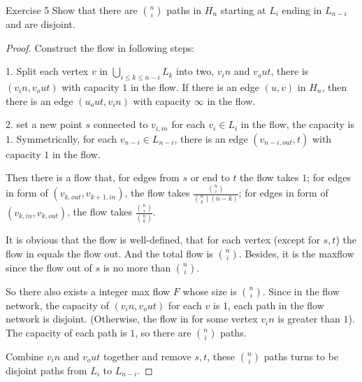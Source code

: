     \begin{thm}{Exercise 5}{}
        Show that there are $\binom{n}{i}$ paths in $H_n$ starting at $L_i$ ending in $L_{n-i}$ and are disjoint. 
    \end{thm}
    \begin{proof}
        Construct the flow in following steps: 

        1. Split each vertex $v$ in $\bigcup_{i\leq k\leq n-i}L_k$ into two, $v_in$ and $v_out$, there is $(v_in,v_out)$ with capacity $1$ in the flow. 
        If there is an edge $(u,v)$ in $H_n$, then there is an edge $(u_out, v_in)$ with capacity $\infty$ in the flow. 

        2. set a new point $s$ connected to $v_{i,in}$ for each $v_i\in L_i$ in the flow, the capacity is $1$. 
        Symmetrically, for each $v_{n-i}\in L_{n-i}$, there is an edge $(v_{n-i,out},t)$ with capacity $1$ in the flow. 

        Then there is a flow that, for edges from $s$ or end to $t$ the flow takes $1$; for edges in form of 
        $(v_{k,out},v_{k+1,in})$, the flow takes $\frac{\binom{n}{i}}{\binom{n}{k}(n-k)}$; 
        for edges in form of $(v_{k,in},v_{k,out})$, the flow takes $\frac{\binom{n}{i}}{\binom{n}{k}}$. 

        It is obvious that the flow is well-defined, that for each vertex (except for $s,t$) the flow in equals the flow out. 
        And the total flow is $\binom{n}{i}$. Besides, it is the maxflow since the flow out of $s$ is no more than $\binom{n}{i}$. 

        So there also exists a integer max flow $F$ whose size is $\binom{n}{i}$. 
        Since in the flow network, the capacity of $(v_in,v_out)$ for each $v$ is $1$, each path in the flow network is disjoint. 
        (Otherwise, the flow in for some vertex $v_in$ is greater than $1$). 
        The capacity of each path is $1$, so there are $\binom{n}{i}$ paths. 

        Combine $v_in$ and $v_out$ together and remove $s,t$, these $\binom{n}{i}$ paths turns to be disjoint paths from $L_i$ to $L_{n-i}$. 
    \end{proof} 

    \newpage


